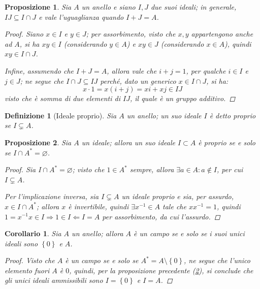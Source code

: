 \documentclass[11pt]{scrartcl}
\theoremstyle{style1}
\newtheorem{prop}{Proposizione}[section]
\newtheorem{corollario}{Corollario}[teorema]
\newtheorem{definizione}{Definizione}[section]
\numberwithin{equation}{subsection}
\begin{document}
\begin{prop}
	Sia $A$ un anello e siano $I,J$ due suoi ideali; in generale, $IJ\subseteq  I\cap J$ e vale l'uguaglianza quando $I+J = A$.
	\begin{proof}
		Siano $x \in I$ e $y \in J$; per assorbimento, visto che $x,y$ appartengono anche ad $A$, si ha $xy \in I$ (considerando $y \in A$) e $xy \in J$ (considerando $x \in A$), quindi $xy \in I\cap J$.

		Infine, assumendo che $I + J = A$, allora vale che $i + j = 1$, per qualche $i \in I$ e $j \in J$; ne segue che $I\cap J \subseteq IJ$ perch\'e, dato un generico $x \in I\cap J$, si ha:
		\[
		x \cdot 1 = x (i + j) = xi  + xj \in IJ
		\] 
		visto che \`e somma di due elementi di $IJ$, il quale \`e un gruppo additivo.
	\end{proof}
\end{prop}
\begin{definizione}
	[Ideale proprio]
	Sia $A$ un anello; un suo ideale $I$ \`e detto \textit{proprio} se $I \subsetneq A$.
\end{definizione}
\begin{prop}\label{idprop}
	Sia $A$ un ideale; allora un suo ideale $I \subset A$ \`e proprio se e solo se $I \cap A^* = \varnothing$.
	\begin{proof}
		Sia $I\cap A^* = \varnothing$; visto che $1 \in A^*$ sempre, allora $\exists a \in A : a \not\in I$, per cui $I \subsetneq A$.

		Per l'implicazione inversa, sia $I \subsetneq A$ un ideale proprio e sia, per assurdo, $x \in I \cap A^*$; allora $x$ \`e invertibile, quindi $\exists x^{-1} \in A$ tale che $x x^{-1} = 1$, quindi $1= x^{-1} x \in I \Rightarrow 1 \in I \Leftarrow I = A$ per assorbimento, da cui l'assurdo.
	\end{proof}
\end{prop}
\begin{corollario}
	Sia $A$ un anello; allora $A$ \`e un campo se e solo se i suoi unici ideali sono $\left\{ 0 \right\} $ e $A$.
	\begin{proof}
		Visto che $A$ \`e un campo se e solo se $A^* = A \setminus\left\{ 0 \right\} $, ne segue che l'unico elemento fuori $A$ \`e $0$, quindi, per la proposizione precedente (\ref{idprop}), si conclude che gli unici ideali ammissibili sono $I=\left\{ 0 \right\} $ e $I=A$.
	\end{proof}
\end{corollario}
\end{document}
